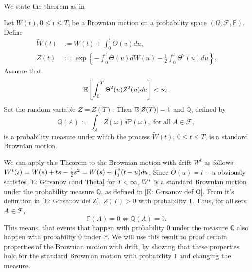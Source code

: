 We state the theorem as in \cite[Theorem 5.2.3]{Shreve2004}
\begin{theorem}[Girsanov] \label{T: Girsanov}
	Let $W(t), 0 \leq t \leq T$, be a Brownian motion on a probability space
	$(\Omega, \mathcal{F}, \mathbb{P})$.
	Define
	\begin{align}
	\tilde{W}(t) &:= W(t) + \int_0^t \Theta(u)du, \label{E: Girsanov def W tilde} \\ 
	Z(t) &:= \exp \left\{ -\int_{0}^{t} \Theta(u) dW(u) - \frac{1}{2} \int_0^t \Theta^2(u)du \right\}. \label{E: Girsanov def Z}
	\end{align}
	Assume that
	\begin{equation} \label{E: Girsanov cond Theta}
	\mathbb{E} \left[  \int_{0}^{T} \Theta^2(u) Z^2(u)du   \right] < \infty.
	\end{equation}
	Set the random variable $Z=Z(T)$. Then $\mathbb{E}[Z(T)] = 1$ and $\mathbb{Q}$, defined by
	\begin{equation} \label{E: Girsanov def Q}
	\mathbb{Q}(A) := \int_A Z(\omega) d\mathbb{P}(\omega), \; \text{for all} \; A \in \mathcal{F},
	\end{equation}
	is a probability measure under which the process 
	$\tilde{W}(t)$, $0 \leq t \leq T$, 
	is a standard Brownian motion.
\end{theorem}

We can apply this Theorem to the Brownian motion with drift $W^t$ as follows:
$W^t(s) = W(s) + ts - \frac{1}{2} s^2 = W(s) + \int_0^s (t-u)du $.
Since $\Theta(u) = t-u$ obviously satisfies \ref{E: Girsanov cond Theta} for $T < \infty$,
$W^t$ is a standard Brownian motion under the probability measure $\mathbb{Q}$, 
as defined in \eqref{E: Girsanov def Q}. 
From it's definition in \eqref{E: Girsanov def Z}, $Z(T) > 0$ with probability $1$.
Thus, for all sets $A \in \mathcal{F}$,
\begin{equation} \label{E: P0 = Q0}
\mathbb{P}(A) = 0 \iff \mathbb{Q}(A) = 0.
\end{equation}
This means, that events that happen with probability $0$ under the measure $\mathbb{Q}$ also happen with probability $0$ under $\mathbb{P}$.
We will use this result to proof certain properties of the Brownian motion with drift,
by showing that these properties hold for the standard Brownian motion with probability $1$ and changing the measure.


